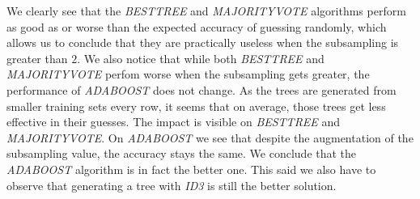 \documentclass[9pt]{extarticle}
\begin{document}
	We clearly see that the \emph{BESTTREE} and \emph{MAJORITYVOTE} algorithms perform as good as or worse than the expected accuracy of guessing randomly, which allows us to conclude that they are practically useless when the subsampling is greater than $2$.  We also notice that while both \emph{BESTTREE} and \emph{MAJORITYVOTE} perfom worse when the subsampling gets greater, the performance of \emph{ADABOOST} does not change. As the trees are generated from smaller training sets every row, it seems that on average, those trees get less effective in their guesses. The impact is visible on \emph{BESTTREE} and \emph{MAJORITYVOTE}. On \emph{ADABOOST} we see that despite the augmentation of the subsampling value, the accuracy stays the same. We conclude that the \emph{ADABOOST} algorithm is in fact the better one. This said we also have to observe that generating a tree with \emph{ID3} is still the better solution.
\end{document}
